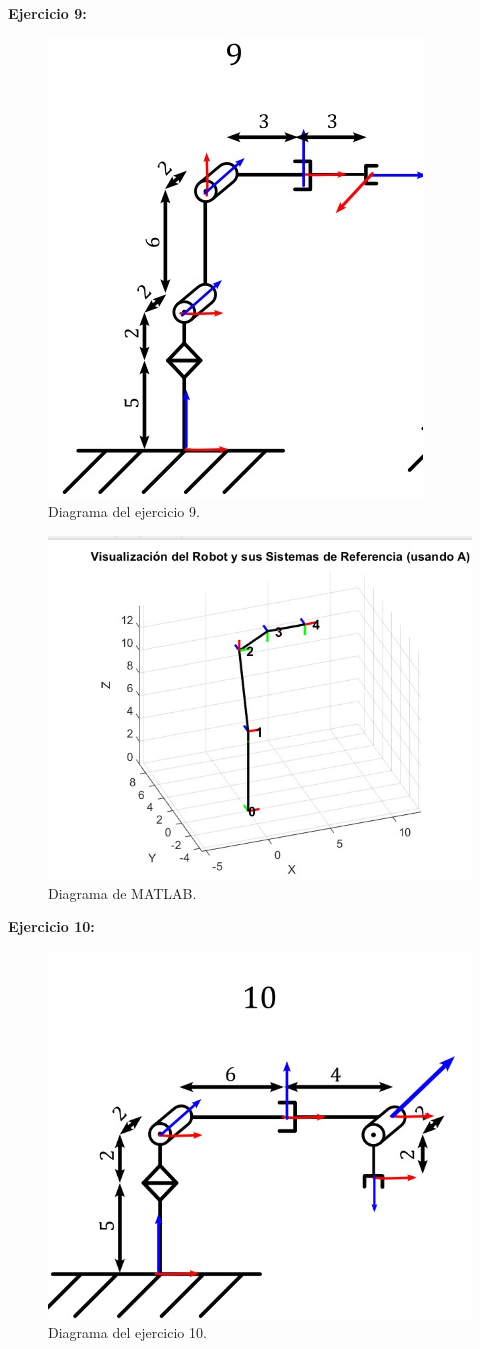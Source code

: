 \clearpage

\textbf{Ejercicio 9:}
\vspace{5mm}

\begin{figure}[htbp]
	\centering
	\includegraphics[width=0.5\linewidth]{img/9EJ}
	\caption{Diagrama del ejercicio 9.}
	\label{fig:9ej}
\end{figure}

\begin{figure}[htbp]
	\centering
	\includegraphics[width=0.5\linewidth]{img/EJ9}
	\caption{Diagrama de MATLAB.}
	\label{fig:ej9}
\end{figure}

\clearpage

\textbf{Ejercicio 10:}
\vspace{5mm}

\begin{figure}[htbp]
	\centering
	\includegraphics[width=0.5\linewidth]{img/10ej}
	\caption{Diagrama del ejercicio 10.}
	\label{fig:10ej}
\end{figure}

